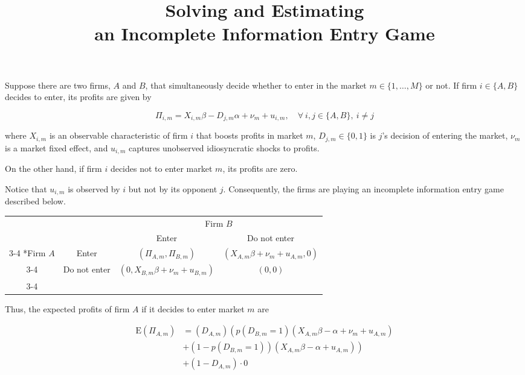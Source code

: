 \documentclass[cm,linguex]{glossa}
\title[Empirical Industrial Organization]{Solving and Estimating\\
an Incomplete Information Entry Game}
\author[Lezama]{
    \spauthor{Carlos Enrique Lezama Jacinto\\
  \institute{\hfill\break
Instituto Tecnológico\\
Autónomo de México}\\
  \small{\hfill\break
clezamaj@itam.mx}
  }%
  }
\newcommand{\ev}{\text{E}}
\begin{document}
\sffamily
\maketitle



\rmfamily

Suppose there are two firms, \(A\) and \(B\), that simultaneously decide
whether to enter in the market \(m \in \{1, \dots, M\}\) or not. If firm
\(i \in \{A, B\}\) decides to enter, its profits are given by

\[
\Pi_{i, m} = X_{i, m} \beta - D_{j, m} \alpha + \nu_m + u_{i, m}, \quad \forall\ i, j \in \{A, B\},\ i \neq j
\]

where \(X_{i, m}\) is an observable characteristic of firm \(i\) that
boosts profits in market \(m\), \(D_{j, m} \in \{0, 1\}\) is \(j\)'s
decision of entering the market, \(\nu_m\) is a market fixed effect, and
\(u_{i, m}\) captures unobserved idiosyncratic shocks to profits.

On the other hand, if firm \(i\) decides not to enter market \(m\), its
profits are zero.

Notice that \(u_{i, m}\) is observed by \(i\) but not by its opponent
\(j\). Consequently, the firms are playing an incomplete information
entry game described below.

\begin{center}
\begin{tabular}{cc|c|c|}
    & \multicolumn{1}{c}{} & \multicolumn{2}{c}{Firm $B$}\\
                            & \multicolumn{1}{c}{} & \multicolumn{1}{c}{Enter}                             & \multicolumn{1}{c}{Do not enter}                      \\\cline{3-4}
    \multirow{2}*{Firm $A$} & Enter                & $\left(\Pi_{A ,m}, \Pi_{B, m}\right)$                 & $\left( X_{A, m} \beta + \nu_m + u_{A, m}, 0 \right)$ \\\cline{3-4}
                            & Do not enter         & $\left( 0, X_{B, m} \beta + \nu_m + u_{B, m} \right)$ & $\left(0, 0\right)$                                   \\\cline{3-4}
\end{tabular}
\end{center}

Thus, the expected profits of firm \(A\) if it decides to enter market
\(m\) are

\begin{align*}
    \ev\left(\Pi_{A, m}\right) & = \left( D_{A, m} \right) \left( p(D_{B, m} = 1) \left( X_{A, m} \beta - \alpha + \nu_m + u_{A, m} \right) \right. \\ &+ \left. \left( 1 - p(D_{B, m} = 1)\right) \left( X_{A, m} \beta - \alpha + u_{A, m} \right) \right) \\
    &+ \left( 1 - D_{A, m} \right) \cdot 0
\end{align*}
\end{document}
